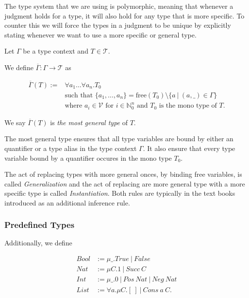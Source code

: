 \documentclass[]{scrbook}
\newenvironment{letIn}
{Let}
{\newline
\text{\textemdash}
}
\theoremstyle{definition}
\theoremstyle{definition}
\theoremstyle{definition}
\theoremstyle{remark}
\let\BeginKnitrBlock\begin \let\EndKnitrBlock\end
\begin{document}
The type system that we are using is polymorphic, meaning that whenever
a judgment holds for a type, it will also hold for any type that is more
specific. To counter this we will force the types in a judgment to be
unique by explicitly stating whenever we want to use a more specific or
general type.

\BeginKnitrBlock{definition}[Most General Type]
\protect\hypertarget{def:unnamed-chunk-28}{}{\label{def:unnamed-chunk-28}
{} }

\begin{letIn} $\Gamma$ be a type context and $T\in\mathcal{T}$. 
\end{letIn}

We define \(\overline{\Gamma}:\Gamma \to \mathcal{T}\) as

\[\begin{aligned}
\overline{\Gamma}(T) := &\forall a_1 \dots \forall a_n.T_0\\
&\text{such that } \{a_1,\dots,a_n\}=\text{free}(T_0)\setminus \{a \ | \ (a,\_)\in\Gamma\}\\
& \text{where } a_i\in\mathcal{V} \text{ for } i\in\mathbb{N}_0^n \text{ and } T_0 \text{ is the mono type of } T.
\end{aligned}\]

We say \(\overline{\Gamma}(T)\) is \emph{the most general type} of
\(T\).
\EndKnitrBlock{definition}

The most general type ensures that all type variables are bound by
either an quantifier or a type alias in the type context \(\Gamma\). It
also ensure that every type variable bound by a quantifier occures in
the mono type \(T_0\).

The act of replacing types with more general onces, by binding free
variables, is called \emph{Generalization} and the act of replacing are
more general type with a more specific type is called
\emph{Instantiation}. Both rules are typically in the text books
\autocite{AdvancedTypesAndProgrammingLangauges} introduced as an
additional inference rule.

\subsubsection*{Predefined Types}\label{predefined-types}

Additionally, we define

\[
\begin{aligned}
\mathit{Bool}&:=\mu \_.\mathit{True} \ |\ \mathit{False}\\
\mathit{Nat}&:=\mu C. 1 \ |\ \mathit{Succ} \ C\\
\mathit{Int}&:=\mu \_. 0 \ |\ \mathit{Pos} \ Nat \ | \ \mathit{Neg} \ \mathit{Nat}\\
\mathit{List}&:=\forall a.\mu C. [ \ ] \ | \ \mathit{Cons} \ a \ C.
\end{aligned}
\]
\end{document}

